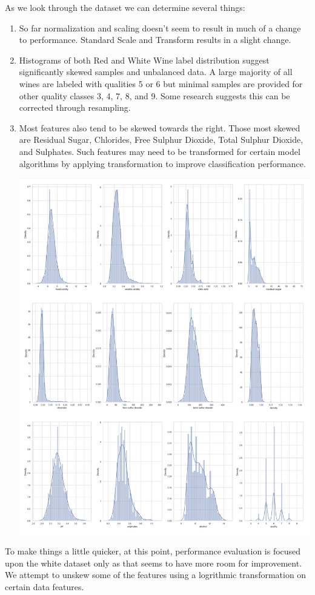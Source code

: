 \documentclass[titlepage]{article}
\begin{document}
As we look through the dataset we can determine several things:  
\begin{enumerate}
	\item So far normalization and scaling doesn't seem to result in much of a change to performance.  Standard Scale and Transform results in a slight change.  
	\item Histograms of both Red and White Wine label distribution suggest significantly skewed samples and unbalanced data.  A large majority of all wines are labeled with qualities 5 or 6 but minimal samples are provided for other quality classes 3, 4, 7, 8, and 9.  Some research suggests this can be corrected through resampling.  
	\item Most features also tend to be skewed towards the right. Those most skewed are Residual Sugar, Chlorides, Free Sulphur Dioxide, Total Sulphur Dioxide, and Sulphates. Such features may need to be transformed for certain model algorithms by applying transformation to improve classification performance.
	\begin{center}
		\includegraphics[width=.6\textwidth]{img/featureskews.png}
	\end{center}

\end{enumerate}

To make things a little quicker, at this point, performance evaluation is focused upon the white dataset only as that seems to have more room for improvement.  We attempt to unskew some of the features using a logrithmic transformation on certain data features.  
\end{document}
